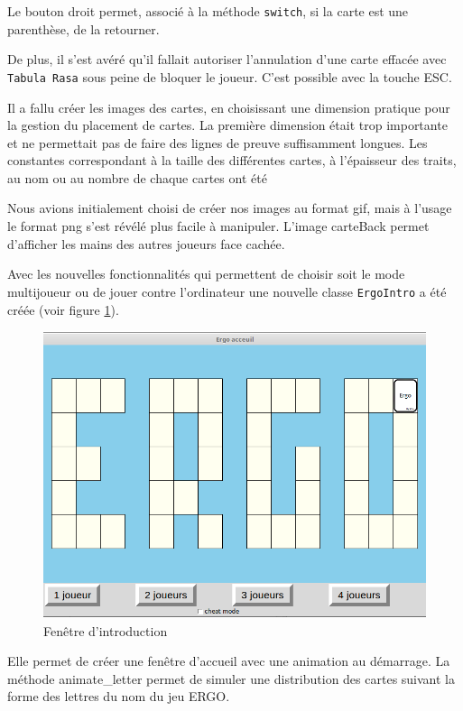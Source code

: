 \documentclass[12pt, algo]{cours}
\begin{document}
Le bouton droit permet, associé à la méthode \texttt{switch}, si la carte est une parenthèse, de la retourner.

De plus, il s'est avéré qu'il fallait autoriser l'annulation d'une carte effacée avec \texttt{Tabula Rasa} sous peine de bloquer le joueur. C'est possible avec la touche ESC.

Il a fallu créer les images des cartes, en choisissant une dimension pratique pour la gestion du placement de cartes. La première dimension était trop importante et ne permettait pas de faire des lignes de preuve suffisamment longues. Les constantes correspondant à la taille des différentes cartes, à l'épaisseur des traits, au nom ou au nombre de chaque cartes ont été 

Nous avions initialement choisi de créer nos images au format gif, mais à l'usage le format png s'est révélé plus facile à manipuler. L'image carteBack permet d'afficher les mains des autres joueurs face cachée.

Avec les nouvelles fonctionnalités qui permettent de choisir soit le mode multijoueur ou de jouer contre l'ordinateur une nouvelle classe \texttt{ErgoIntro} a été créée (voir figure \ref{ergoIntro}).

\begin{figure}
\begin{center}
\includegraphics[scale=0.35]{../images/ima1.png}
\end{center}
\caption{Fenêtre d'introduction}
\label{ergoIntro}
\end{figure} 

Elle permet de créer une fenêtre d’accueil avec une animation au démarrage. La méthode animate\_letter permet de simuler une distribution des cartes suivant la forme des lettres du nom du jeu ERGO.
\end{document}
